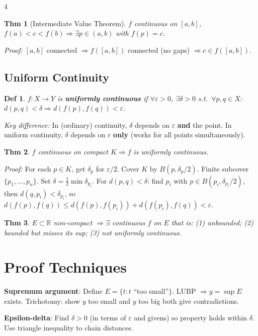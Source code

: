 \documentclass[9pt,landscape]{extarticle}
\newcommand{\R}{\mathbb{R}}
\newcommand{\eps}{\varepsilon}
\theoremstyle{compact}
\newtheorem*{thm}{Thm}
\newtheorem*{defn}{Def}
\begin{document}
\begin{multicols}{4}
\begin{thm}[Intermediate Value Theorem]
$f$ continuous on $[a,b]$, $f(a) < c < f(b) \Rightarrow \exists p \in (a,b)$ with $f(p) = c$.
\end{thm}
\textit{Proof:} $[a,b]$ connected $\Rightarrow f([a,b])$ connected (no gaps) $\Rightarrow c \in f([a,b])$.

\subsection{Uniform Continuity}
\begin{defn}
$f: X \to Y$ is \textbf{uniformly continuous} if $\forall \eps > 0$, $\exists \delta > 0$ s.t.\ $\forall p,q \in X$: $d(p,q) < \delta \Rightarrow d(f(p),f(q)) < \eps$.
\end{defn}

\textit{Key difference:} In (ordinary) continuity, $\delta$ depends on $\eps$ \textbf{and} the point. In uniform continuity, $\delta$ depends on $\eps$ \textbf{only} (works for all points simultaneously).

\begin{thm}
$f$ continuous on compact $K \Rightarrow f$ is uniformly continuous.
\end{thm}
\textit{Proof:} For each $p \in K$, get $\delta_p$ for $\eps/2$. Cover $K$ by $B(p, \delta_p/2)$. Finite subcover $\{p_1, \ldots, p_n\}$. Set $\delta = \frac{1}{2}\min \delta_{p_i}$. For $d(p,q) < \delta$: find $p_i$ with $p \in B(p_i, \delta_{p_i}/2)$, then $d(q,p_i) < \delta_{p_i}$, so $d(f(p),f(q)) \leq d(f(p),f(p_i)) + d(f(p_i),f(q)) < \eps$.

\begin{thm}
$E \subset \R$ non-compact $\Rightarrow \exists$ continuous $f$ on $E$ that is: (1) unbounded; (2) bounded but misses its sup; (3) not uniformly continuous.
\end{thm}

\section{Proof Techniques}

\textbf{Supremum argument}: Define $E = \{t : t$ ``too small''$\}$. LUBP $\Rightarrow y = \sup E$ exists. Trichotomy: show $y$ too small and $y$ too big both give contradictions.

\textbf{Epsilon-delta}: Find $\delta > 0$ (in terms of $\eps$ and givens) so property holds within $\delta$. Use triangle inequality to chain distances.


\end{multicols}
\end{document}
